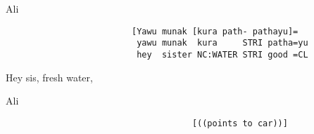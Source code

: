 \begin{transbox}{2}{Ali}
\begin{verbatim}
                         [Yawu munak [kura path- pathayu]=
                          yawu munak  kura     STRI patha=yu
                          hey  sister NC:WATER STRI good =CL
\end{verbatim}\vspace*{-3mm}
Hey sis, fresh water,
\end{transbox}

\begin{transbox}{3}{Ali}
\begin{verbatim}
                                     [((points to car))]
\end{verbatim}\vspace*{-3mm}
\end{transbox}
\z


